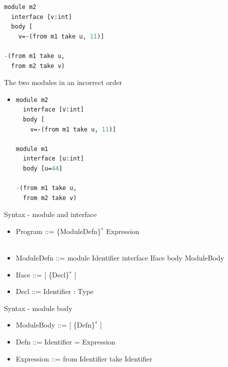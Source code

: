 \documentclass{article}
\begin{document}
\begin{huge}
\begin{minipage}[t]{.5\textwidth}
\begin{itemize}
\begin{lstlisting}[language=Lisp]
module m2
  interface [v:int]
  body [
    v=-(from m1 take u, 11)]
  
-(from m1 take u, 
  from m2 take v)  
\end{lstlisting}
\end{itemize}
\end{minipage}


\begin{minipage}[t]{.5\textwidth}
The two modules in an incorrect order
\begin{itemize}
\item
\begin{lstlisting}[language=Lisp]
module m2
  interface [v:int]
  body [
    v=-(from m1 take u, 11)]
    
module m1 
  interface [u:int]
  body [u=44]
    
-(from m1 take u, 
  from m2 take v)  
\end{lstlisting}
\end{itemize}
\end{minipage}


Syntax - module and interface
\begin{itemize}
\item Program ::= \{ModuleDefn\}$^*$ Expression \\
    \\
\item ModuleDefn ::= module Identifier interface Iface body ModuleBody \\
\item Iface ::= [ \{Decl\}$^*$ ] \\
\item Decl ::= Identifier : Type \\
\end{itemize}


Syntax - module body
\begin{itemize}
\item ModuleBody ::= [ \{Defn\}$^*$ ] \\
\item Defn ::= Identifier = Expression \\
\item Expression ::= from Identifier take Identifier \\
\end{itemize}


\end{huge}
\end{document}

